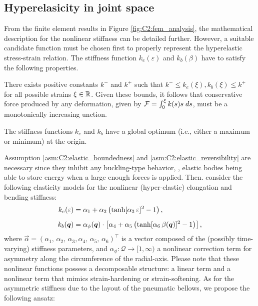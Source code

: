 \subsection{Hyperelasicity  in joint space}
\label{sec:C2:hyperelastic}
\noindent From the finite element results in Figure \ref{fig:C2:fem_analysis}, the mathematical description for the nonlinear stiffness can be detailed further. However, a suitable candidate function must be chosen first to properly represent the hyperelastic stress-strain relation. The stiffness function $k_e (\varepsilon)$ and $k_b (\beta)$  have to satisfy the following properties.
%
\begin{asm}
\label{asm:C2:elastic_boundedness}
There exists positive constants ${k}^{-}$ and ${k}^{+}$ such that ${k}^{-} \le k_e(\xi),k_b(\xi) \le {k}^{+}$ for all possible strains $\xi \in \mathbb{R}$.  Given these bounds, it follows that conservative force produced by any deformation, given by ${\mathcal{F}} = \int_0^\xi k(s)s\;ds$, must be a monotonically increasing unction.  
\end{asm}
%
\begin{asm}
\label{asm:C2:elastic_reversibility}
The stiffness functions $k_e$ and $k_b$ have a global optimum (i.e., either a maximum or minimum) at the origin. 
\end{asm}
%
Assumption \ref{asm:C2:elastic_boundedness} and \ref{asm:C2:elastic_reversibility} are necessary since  they inhibit any buckling-type behavior, \ie, elastic bodies being able to store energy when a large enough forces is applied. Then. consider the following elasticity models for the nonlinear (hyper-elastic) elongation and bending stiffness:
%
\begin{align}
\label{eq:C2:stiffness_tanh_eps}
{k}_e(\varepsilon) & = \alpha_1 + \alpha_2 \left( \tanh[\alpha_3\,\varepsilon]^2 - 1 \right), \\[0.5em]
\label{eq:C2:stiffness_tanh_beta}
{k}_b({\boldsymbol{q}})  & = \alpha_{\phi}({\boldsymbol{q}}) \cdot \left[\alpha_4 + \alpha_5 \left( \tanh[\alpha_6\,\beta({\boldsymbol{q}})]^2 - 1 \right)\right], 
\end{align}
%
where $\vec{\alpha} = \left(\alpha_1,\,\alpha_2,\,\alpha_3,\alpha_4,\,\alpha_5,\,\alpha_6 \right)^\top$ is a vector composed of the (possibly time-varying) stiffness parameters, and $\alpha_\phi: \mathcal{Q} \to [1,\infty)$ a nonlinear correction term for asymmetry along the circumference of the radial-axis. Please note that these nonlinear functions possess a decomposable structure: a linear term and a nonlinear term that mimics strain-hardening or strain-softening. As for the asymmetric stiffness due to the layout of the pneumatic bellows, we propose the following ansatz:
